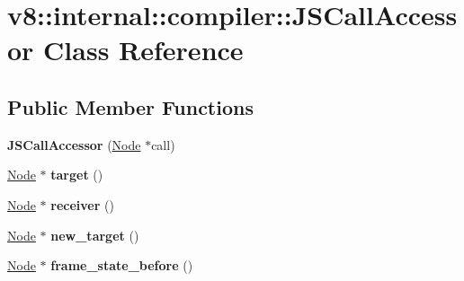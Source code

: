 \hypertarget{classv8_1_1internal_1_1compiler_1_1_j_s_call_accessor}{}\section{v8\+:\+:internal\+:\+:compiler\+:\+:J\+S\+Call\+Accessor Class Reference}
\label{classv8_1_1internal_1_1compiler_1_1_j_s_call_accessor}
\subsection*{Public Member Functions}
\begin{DoxyCompactItemize}
\item 
{\bfseries J\+S\+Call\+Accessor} (\hyperlink{classv8_1_1internal_1_1compiler_1_1_node}{Node} $\ast$call)\hypertarget{classv8_1_1internal_1_1compiler_1_1_j_s_call_accessor_a60a7212fe7310a623816fd8285b7c780}{}\label{classv8_1_1internal_1_1compiler_1_1_j_s_call_accessor_a60a7212fe7310a623816fd8285b7c780}

\item 
\hyperlink{classv8_1_1internal_1_1compiler_1_1_node}{Node} $\ast$ {\bfseries target} ()\hypertarget{classv8_1_1internal_1_1compiler_1_1_j_s_call_accessor_a49e33970dc77680761282f1ceee2316d}{}\label{classv8_1_1internal_1_1compiler_1_1_j_s_call_accessor_a49e33970dc77680761282f1ceee2316d}

\item 
\hyperlink{classv8_1_1internal_1_1compiler_1_1_node}{Node} $\ast$ {\bfseries receiver} ()\hypertarget{classv8_1_1internal_1_1compiler_1_1_j_s_call_accessor_ad5f9791f00bfda413b7e6711f1ff606c}{}\label{classv8_1_1internal_1_1compiler_1_1_j_s_call_accessor_ad5f9791f00bfda413b7e6711f1ff606c}

\item 
\hyperlink{classv8_1_1internal_1_1compiler_1_1_node}{Node} $\ast$ {\bfseries new\+\_\+target} ()\hypertarget{classv8_1_1internal_1_1compiler_1_1_j_s_call_accessor_a5ba16d79b70af5056a40984a1c18b075}{}\label{classv8_1_1internal_1_1compiler_1_1_j_s_call_accessor_a5ba16d79b70af5056a40984a1c18b075}

\item 
\hyperlink{classv8_1_1internal_1_1compiler_1_1_node}{Node} $\ast$ {\bfseries frame\+\_\+state\+\_\+before} ()\hypertarget{classv8_1_1internal_1_1compiler_1_1_j_s_call_accessor_a15ae8fd4745ae9857b7716524aef46ad}{}\label{classv8_1_1internal_1_1compiler_1_1_j_s_call_accessor_a15ae8fd4745ae9857b7716524aef46ad}


\end{DoxyCompactItemize}
